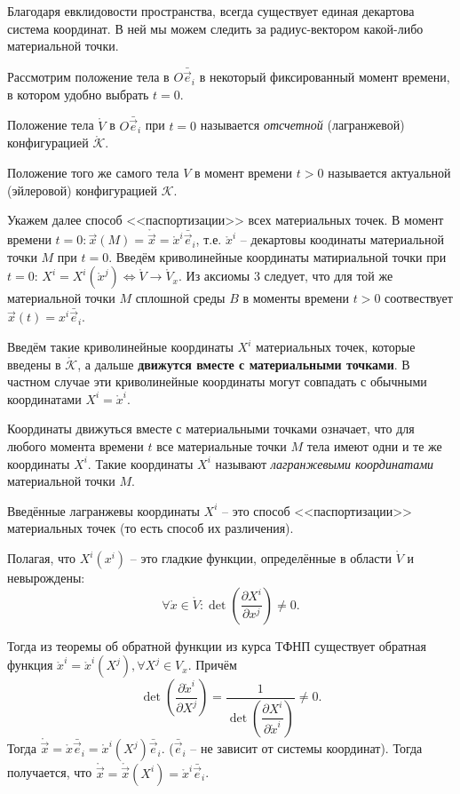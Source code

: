 Благодаря евклидовости пространства, всегда существует единая декартова система координат. В
ней мы можем следить за радиус-вектором какой-либо материальной точки.

Рассмотрим положение тела в $O\bar{\vec{e}}_i$ в некоторый фиксированный момент времени, 
в котором удобно выбрать $t=0$.


Положение тела $\mathring{V}$ в $O\bar{\vec{e}}_i$ при $t=0$ называется \emph{отсчетной}
(лагранжевой) конфигурацией $\mathring{\mathcal{K}}$.

Положение того же самого тела $V$ в момент времени $t > 0$ называется актуальной (эйлеровой)
конфигурацией $\mathcal{K}$.

Укажем далее способ <<паспортизации>> всех материальных точек. В момент времени $t = 0 :
\vec{x}(M) = \mathring{\vec{x}} = \mathring{x}^{i} \bar{\vec{e}}_i$, т.е. $\mathring{x}^{i}$
-- декартовы коодинаты материальной
точки $M$ при $t=0$. Введём криволинейные координаты матириальной точки при $t=0$:
$X^i = X^i(\mathring{x}^j) \Leftrightarrow \mathring{V} \to \mathring{V}_x$. Из аксиомы 3 следует, что для той же 
материальной точки $M$ сплошной среды $B$ в моменты времени $t > 0$ соотвествует $\vec{x}(t) = x^i \bar{\vec{e}}_i$.

Введём такие криволинейные координаты $X^i$ материальных точек, которые введены в
$\mathring{\mathcal{K}}$, а дальше \textbf{движутся вместе с материальными точками}. В частном
случае эти криволинейные координаты могут совпадать с обычными координатами $X^i = \mathring{x}^i$.


Координаты движуться вместе с материальными точками означает, что для любого момента времени $t$ 
все материальные точки $M$ тела имеют одни и те же координаты $X^i$. Такие координаты $X^i$ называют
\emph{лагранжевыми координатами} материальной точки $M$.

Введённые лагранжевы координаты $X^i$ -- это способ <<паспортизации>> материальных точек (то есть
способ их различения).

Полагая, что $X^i(x^i)$ -- это гладкие функции, определённые в области $\mathring{V}$ и невырождены:
\[
  \forall \mathring{x} \in \mathring V : \det \left( \dfrac{\partial X^i}{\partial x^j}  \right) \neq 0.
\]

Тогда из теоремы об обратной функции из курса ТФНП существует обратная функция $\mathring{x}^i
= \mathring{x}^i (X^j), \forall X^j \in V_x$. Причём
\[
  \det \left( \dfrac{\partial \mathring{x}^i}{\partial X^{j}}  \right)
  = \dfrac{1}{\det \left( \dfrac{\partial X^i}{\partial \mathring{x}^i}  \right) } \neq 0.
\]
Тогда $\mathring{\vec{x}} = \mathring{x} \bar{\vec{e}}_i = \mathring{x}^i (X^j) \bar{\vec{e}}_i$.
($\bar{\vec{e}}_i$ -- не зависит от системы координат). Тогда получается, что
$\mathring{\vec{x}} = \mathring{\vec{x}} ( X^i) = \mathring{x}^i \bar{\vec{e}}_i$.

